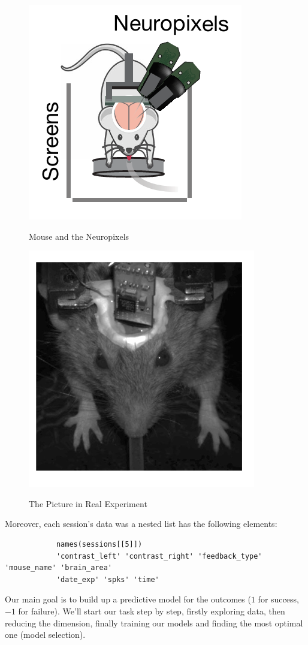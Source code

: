 \documentclass{article}
\begin{document}
	\begin{figure}[htbp]
		\centering
		\begin{minipage}[t]{0.48\textwidth}
			\centering
			\includegraphics[scale=0.4]{Pics/Mouse}\label{fig:1.01}
			\caption{Mouse and the Neuropixels}
		\end{minipage}
		\begin{minipage}[t]{0.48\textwidth}
			\centering
			\includegraphics[scale=0.4]{Pics/Mouse2}\label{fig:1.02}
			\caption{The Picture in Real Experiment}
		\end{minipage}
	\end{figure}
	\clearpage
	\par Moreover, each session's data was a nested list has the following elements:
		\begin{framed}
		\begin{verbatim}
			names(sessions[[5]])
			'contrast_left' 'contrast_right' 'feedback_type' 'mouse_name' 'brain_area' 
			'date_exp' 'spks' 'time'
		\end{verbatim}
	\end{framed}
	\par Our main goal is to build up a predictive model for the outcomes ($1$ for success, $-1$ for failure). We'll start our task step by step, firstly exploring data, then reducing the dimension, finally training our models and finding the most optimal one (model selection).
\end{document}
